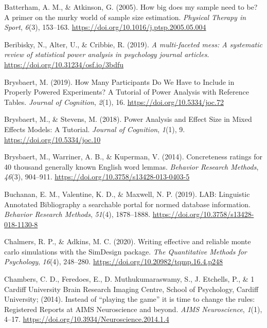 \documentclass[
  man]{apa7}
\newlength{\cslhangindent}
\newlength{\cslentryspacingunit} %
\newenvironment{CSLReferences}[2] %
 {%
  \setlength{\parindent}{0pt}
  \ifodd #1
  \let\oldpar\par
  \def\par{\hangindent=\cslhangindent\oldpar}
  \fi
  \setlength{\parskip}{#2\cslentryspacingunit}
 }%
 {}
\begin{document}
\begin{CSLReferences}{1}{0}
\leavevmode{}%
Batterham, A. M., \& Atkinson, G. (2005). How big does my sample need to be? A primer on the murky world of sample size estimation. \emph{Physical Therapy in Sport}, \emph{6}(3), 153--163. \url{https://doi.org/10.1016/j.ptsp.2005.05.004}

\leavevmode{}%
Beribisky, N., Alter, U., \& Cribbie, R. (2019). \emph{A multi-faceted mess: A systematic review of statistical power analysis in psychology journal articles}. \url{https://doi.org/10.31234/osf.io/3bdfu}

\leavevmode{}%
Brysbaert, M. (2019). How Many Participants Do We Have to Include in Properly Powered Experiments? A Tutorial of Power Analysis with Reference Tables. \emph{Journal of Cognition}, \emph{2}(1), 16. \url{https://doi.org/10.5334/joc.72}

\leavevmode{}%
Brysbaert, M., \& Stevens, M. (2018). Power Analysis and Effect Size in Mixed Effects Models: A Tutorial. \emph{Journal of Cognition}, \emph{1}(1), 9. \url{https://doi.org/10.5334/joc.10}

\leavevmode{}%
Brysbaert, M., Warriner, A. B., \& Kuperman, V. (2014). Concreteness ratings for 40 thousand generally known English word lemmas. \emph{Behavior Research Methods}, \emph{46}(3), 904--911. \url{https://doi.org/10.3758/s13428-013-0403-5}

\leavevmode{}%
Buchanan, E. M., Valentine, K. D., \& Maxwell, N. P. (2019). LAB: Linguistic Annotated Bibliography {\textendash} a searchable portal for normed database information. \emph{Behavior Research Methods}, \emph{51}(4), 1878--1888. \url{https://doi.org/10.3758/s13428-018-1130-8}

\leavevmode{}%
Chalmers, R. P., \& Adkins, M. C. (2020). Writing effective and reliable monte carlo simulations with the SimDesign package. \emph{The Quantitative Methods for Psychology}, \emph{16}(4), 248--280. \url{https://doi.org/10.20982/tqmp.16.4.p248}

\leavevmode{}%
Chambers, C. D., Feredoes, E., D. Muthukumaraswamy, S., J. Etchells, P., \& 1 Cardiff University Brain Research Imaging Centre, School of Psychology, Cardiff University; (2014). Instead of {``}playing the game{''} it is time to change the rules: Registered Reports at AIMS Neuroscience and beyond. \emph{AIMS Neuroscience}, \emph{1}(1), 4--17. \url{https://doi.org/10.3934/Neuroscience.2014.1.4}


\end{CSLReferences}
\end{document}
